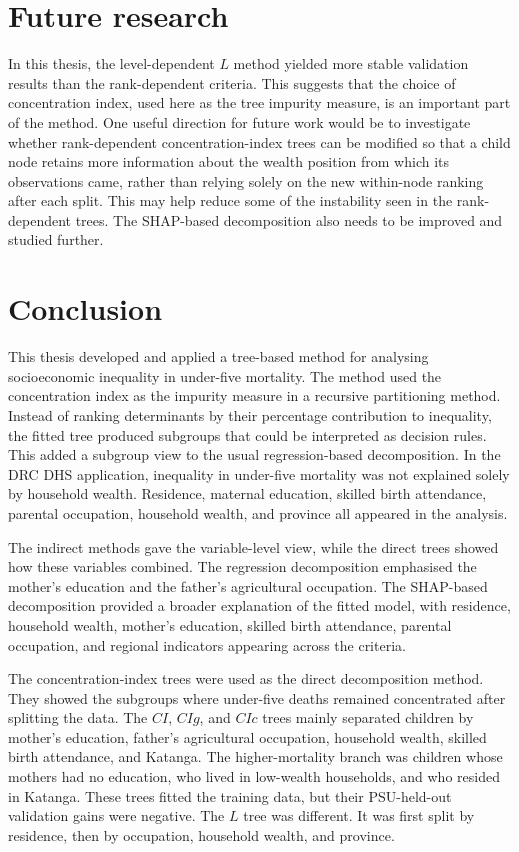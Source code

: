 \documentclass[
  11pt,
  a4paper,
]{article}
\begin{document}
\section{Future research}\label{future-research}

In this thesis, the level-dependent \(L\) method yielded more stable
validation results than the rank-dependent criteria. This suggests that
the choice of concentration index, used here as the tree impurity
measure, is an important part of the method. One useful direction for
future work would be to investigate whether rank-dependent
concentration-index trees can be modified so that a child node retains
more information about the wealth position from which its observations
came, rather than relying solely on the new within-node ranking after
each split. This may help reduce some of the instability seen in the
rank-dependent trees. The SHAP-based decomposition also needs to be
improved and studied further.

\section{Conclusion}\label{conclusion}

This thesis developed and applied a tree-based method for analysing
socioeconomic inequality in under-five mortality. The method used the
concentration index as the impurity measure in a recursive partitioning
method. Instead of ranking determinants by their percentage contribution
to inequality, the fitted tree produced subgroups that could be
interpreted as decision rules. This added a subgroup view to the usual
regression-based decomposition. In the DRC DHS application, inequality
in under-five mortality was not explained solely by household wealth.
Residence, maternal education, skilled birth attendance, parental
occupation, household wealth, and province all appeared in the analysis.

The indirect methods gave the variable-level view, while the direct
trees showed how these variables combined. The regression decomposition
emphasised the mother's education and the father's agricultural
occupation. The SHAP-based decomposition provided a broader explanation
of the fitted model, with residence, household wealth, mother's
education, skilled birth attendance, parental occupation, and regional
indicators appearing across the criteria.

The concentration-index trees were used as the direct decomposition
method. They showed the subgroups where under-five deaths remained
concentrated after splitting the data. The \(CI\), \(CIg\), and \(CIc\)
trees mainly separated children by mother's education, father's
agricultural occupation, household wealth, skilled birth attendance, and
Katanga. The higher-mortality branch was children whose mothers had no
education, who lived in low-wealth households, and who resided in
Katanga. These trees fitted the training data, but their PSU-held-out
validation gains were negative. The \(L\) tree was different. It was
first split by residence, then by occupation, household wealth, and
province.
\end{document}
